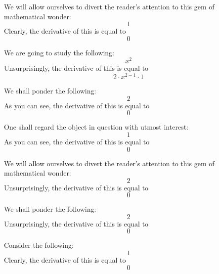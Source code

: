 \documentclass{article}
\begin{document}
We will allow ourselves to divert the reader's attention to this gem of mathematical wonder:
\begin{equation}
1 
\end{equation}
Clearly, the derivative of this is equal to
\begin{equation}
0 
\end{equation}

We are going to study the following:
\begin{equation}
x ^{2 } 
\end{equation}
Unsurprisingly, the derivative of this is equal to
\begin{equation}
2 \cdot x ^{2 - 1 } \cdot 1 
\end{equation}

We shall ponder the following:
\begin{equation}
2 
\end{equation}
As you can see, the derivative of this is equal to
\begin{equation}
0 
\end{equation}

One shall regard the object in question with utmost interest:
\begin{equation}
1 
\end{equation}
As you can see, the derivative of this is equal to
\begin{equation}
0 
\end{equation}

We will allow ourselves to divert the reader's attention to this gem of mathematical wonder:
\begin{equation}
2 
\end{equation}
Unsurprisingly, the derivative of this is equal to
\begin{equation}
0 
\end{equation}

We shall ponder the following:
\begin{equation}
2 
\end{equation}
Unsurprisingly, the derivative of this is equal to
\begin{equation}
0 
\end{equation}

Consider the following:
\begin{equation}
1 
\end{equation}
Clearly, the derivative of this is equal to
\begin{equation}
0 
\end{equation}
\end{document}
